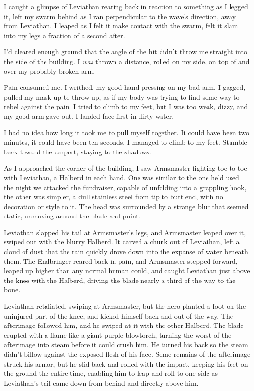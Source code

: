 I caught a glimpse of Leviathan rearing back in reaction to something as I legged it, left my swarm behind as I ran perpendicular to the wave's direction, away from Leviathan.  I leaped as I felt it make contact with the swarm, felt it slam into my legs a fraction of a second after.



I'd cleared enough ground that the angle of the hit didn't throw me straight into the side of the building.  I \emph{was} thrown a distance, rolled on my side, on top of and over my probably-broken arm.



Pain consumed me.  I writhed, my good hand pressing on my bad arm.  I gagged, pulled my mask up to throw up, as if my body was trying to find some way to rebel against the pain.  I tried to climb to my feet, but I was too weak, dizzy, and my good arm gave out.  I landed face first in dirty water.



I had no idea how long it took me to pull myself together.  It could have been two minutes, it could have been ten seconds.  I managed to climb to my feet.  Stumble back toward the carport, staying to the shadows.



As I approached the corner of the building, I saw Armsmaster fighting toe to toe with Leviathan, a Halberd in each hand.  One was similar to the one he'd used the night we attacked the fundraiser, capable of unfolding into a grappling hook, the other was simpler, a dull stainless steel from tip to butt end, with no decoration or style to it.  The head was surrounded by a strange blur that seemed static, unmoving around the blade and point.



Leviathan slapped his tail at Armsmaster's legs, and Armsmaster leaped over it, swiped out with the blurry Halberd.  It carved a chunk out of Leviathan, left a cloud of dust that the rain quickly drove down into the expanse of water beneath them.  The Endbringer reared back in pain, and Armsmaster stepped forward, leaped up higher than any normal human could, and caught Leviathan just above the knee with the Halberd, driving the blade nearly a third of the way to the bone.



Leviathan retaliated, swiping at Armsmaster, but the hero planted a foot on the uninjured part of the knee, and kicked himself back and out of the way.  The afterimage followed him, and he swiped at it with the other Halberd.  The blade erupted with a flame like a giant purple blowtorch, turning the worst of the afterimage into steam before it could crush him.  He turned his back so the steam didn't billow against the exposed flesh of his face.  Some remains of the afterimage struck his armor, but he slid back and rolled with the impact, keeping his feet on the ground the entire time, enabling him to leap and roll to one side as Leviathan's tail came down from behind and directly above him.



